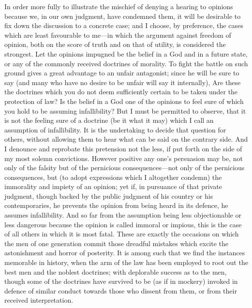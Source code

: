 \documentclass[11pt,openany]{book}
\begin{document}
In order more fully to illustrate the mischief of denying a hearing to opinions because we, in our own judgment, have condemned them, it will be desirable to fix down the discussion to a concrete case; and I choose, by preference, the cases which are least favourable to me---in which the argument against freedom of opinion, both on the score of truth and on that of utility, is considered the strongest. Let the opinions impugned be the belief in a God and in a future state, or any of the commonly received doctrines of morality. To fight the battle on such ground gives a great advantage to an unfair antagonist; since he will be sure to say (and many who have no desire to be unfair will say it internally), Are these the doctrines which you do not deem sufficiently certain to be taken under the protection of law? Is the belief in a God one of the opinions to feel sure of which you hold to be assuming infallibility? But I must be permitted to observe, that it is not the feeling sure of a doctrine (be it what it may) which I call an assumption of infallibility. It is the undertaking to decide that question for others, without allowing them to hear what can be said on the contrary side. And I denounce and reprobate this pretension not the less, if put forth on the side of my most solemn convictions. However positive any one's persuasion may be, not only of the falsity but of the pernicious consequences---not only of the pernicious consequences, but (to adopt expressions which I altogether condemn) the immorality and impiety of an opinion; yet if, in pursuance of that private judgment, though backed by the public judgment of his country or his contemporaries, he prevents the opinion from being heard in its defence, he assumes infallibility. And so far from the assumption being less objectionable or less dangerous because the opinion is called immoral or impious, this is the case of all others in which it is most fatal. These are exactly the occasions on which the men of one generation commit those dreadful mistakes which excite the astonishment and horror of posterity. It is among such that we find the instances memorable in history, when the arm of the law has been employed to root out the best men and the noblest doctrines; with deplorable success as to the men, though some of the doctrines have survived to be (as if in mockery) invoked in defence of similar conduct towards those who dissent from them, or from their received interpretation.
\end{document}
